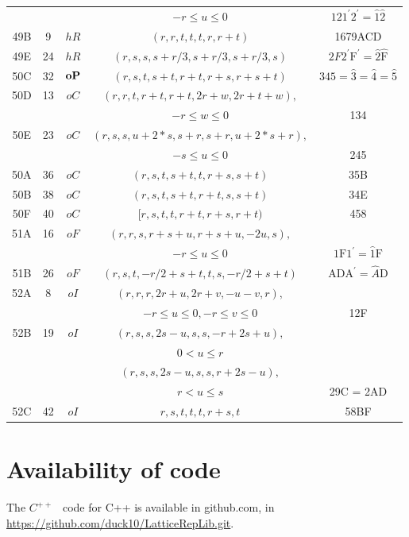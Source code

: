 \documentclass[preprint]{iucr}              %
\numberwithin{equation}{section}
\begin{document}
\begin{table}
\begin{center}
\begin{tabular}{|c|c|c|c|c|}
			&&&$-r \leq u \leq 0$&$121^\prime 2^\prime = \hat{1}\hat{2}$\\
			49B&9&$hR$&$(r,r,t,t,t,r,r+t)$&1679ACD\\
			49E&24&$hR$&$(r,s,s,s+r/3,s+r/3,s+r/3,s)$&$2F2^\prime \text{F}^\prime = \hat{2}\hat{\text{F}}$\\
			\hline
			50C&32&${\bf oP}$&$(r,s,t,s+t,r+t,r+s,r+s+t)$&$345 = \hat{3} = \hat{4} = \hat{5}$\\
			\hline
			50D&13&$oC$&$(r,r,t,r+t,r+t,2r+w,2r+t+w),$&\\
			&&&$-r \leq w \leq 0$&134\\
			50E&23&$oC$&$(r,s,s,u+2*s,s+r,s+r,u+2*s+r),$&\\
			&&&$-s \leq u \leq 0$&245\\
			50A&36&$oC$&$(r,s,t,s+t,t,r+s,s+t)$&35B\\
			50B&38&$oC$&$(r,s,t,s+t,r+t,s,s+t)$&34E\\
			50F&40&$oC$&$[r,s,t,t,r+t,r+s,r+t)$&458\\
			\hline
			51A&16&$oF$&$(r,r,s,r+s+u,r+s+u,-2u,s),$&\\
			&&&$-r \leq u \leq 0$&$\text{1F1}^{\prime} = \hat{1}\text{F}$\\
			51B&26&$oF$&$(r,s,t,-r/2+s+t,t,s,-r/2+s+t)$&$\text{ADA}^{\prime}  = \hat{A}\text{D}$\\
			\hline
			52A&8&$oI$&$(r,r,r,2r+u,2r+v,-u-v,r),$&\\
			&&&$-r \leq u \leq 0, -r \leq v \leq 0$&12F\\
			52B&19&$oI$&$ (r,s,s,2s-u,s,s,-r+2s+u),$&\\
			&&&$0 < u \leq r $&\\
			&&&$ (r,s,s,2s-u,s,s,r+2s-u),$&\\
			&&&$r < u \leq s $&29C = 2AD\\
			52C&42&$oI$&$r,s,t,t,t,r+s,t$&58BF\\
			\hline
		\end{tabular}
	\end{center}
	\label{NiggliFormsI}
\end{table}%
	
	\section{Availability of code}
	
	The $C^{++}$ ~code for C++ is available in github.com, in
	\url{https://github.com/duck10/LatticeRepLib.git}.
	
	
\end{document}
